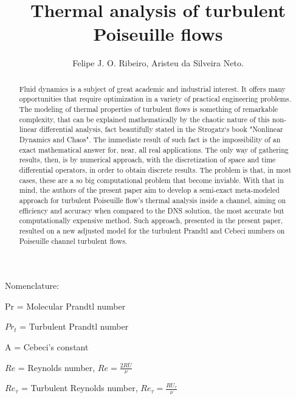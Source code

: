 \documentclass[10pt]{article} %
\title{ \loll Thermal analysis of turbulent Poiseuille flows}
\author{Felipe J. O. Ribeiro, Aristeu da Silveira Neto.}
\begin{document}
\maketitle


\begin{abstract}
	\noindent Fluid dynamics is a subject of great academic and industrial interest. It offers many opportunities that require optimization in a variety of practical engineering problems. The modeling of thermal properties of turbulent flows is something of remarkable complexity, that can be explained mathematically by the chaotic nature of this non-linear differential analysis, fact beautifully stated in the Strogatz`s book "Nonlinear Dynamics and Chaos". The immediate result of such fact is the impossibility of an exact mathematical answer for, near, all real applications. The only way of gathering results, then, is by numerical approach, with the discretization of space and time differential operators, in order to obtain discrete results. The problem is that, in most cases, these are a so big computational problem that become inviable. With that in mind, the authors of the present paper aim to develop a semi-exact meta-modeled approach for turbulent Poiseuille flow's thermal analysis inside a channel, aiming on efficiency and accuracy when compared to the DNS solution, the most accurate but computationally expensive method. Such approach, presented in the present paper, resulted on a new adjusted model for the turbulent Prandtl and Cebeci numbers on Poiseuille channel turbulent flows.
\end{abstract} 

\vspace{8.0mm}

\begin{LARGE}
	Nomenclature: 
\end{LARGE} 


	Pr = Molecular Prandtl number
	
	$ Pr_t $ = Turbulent Prandtl number 
	
	A = Cebeci's constant
	
	
	$Re$ = Reynolds number, $Re = \frac{2R \overline{U}}{\nu}$
	
	
	$Re_\tau$ = Turbulent Reynolds number, $Re_\tau = \frac{R U_\tau}{\nu}$
	
\end{document}
